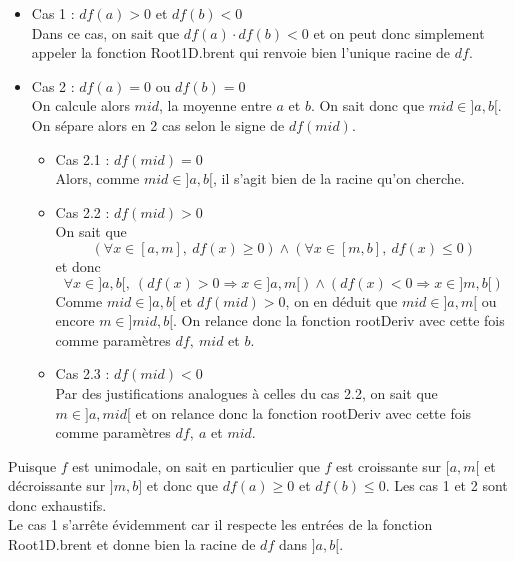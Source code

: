 \documentclass[a4paper, 12pt]{article}
\begin{document}
\begin{itemize}

    \item Cas 1 : \( df(a) > 0 \) et \( df(b) < 0 \) \\
Dans ce cas, on sait que \( df(a) \cdot df(b) < 0 \) et on peut donc simplement appeler la fonction Root1D.brent qui renvoie bien l'unique racine de \( df \).

    \item Cas 2 : \( df(a) = 0 \) ou \( df(b) = 0 \) \\
On calcule alors \( mid \), la moyenne entre \( a \) et \( b \). On sait donc que \( mid \in ]a, b[ \). On sépare alors en 2 cas selon le signe de \( df(mid) \).
    \begin{itemize}

        \item Cas 2.1 : \( df(mid) = 0 \) \\
Alors, comme \( mid \in ]a, b[ \), il s'agit bien de la racine qu'on cherche.

        \item Cas 2.2 : \( df(mid) > 0 \) \\
On sait que
$$
(\forall x \in [a, m],~ df(x) \geq 0) \land (\forall x \in [m, b],~ df(x) \leq 0)
$$
et donc
$$
\forall x \in ]a, b[,~ (df(x) > 0 \Longrightarrow x \in ]a, m[) \land (df(x) < 0 \Longrightarrow x \in ]m, b[)
$$
Comme \( mid \in ]a, b[ \) et \( df(mid) > 0 \), on en déduit que \( mid \in ]a, m[ \) ou encore \( m \in ]mid, b[ \). On relance donc la fonction rootDeriv avec cette fois comme paramètres \( df,~ mid \) et \( b \).

    \item Cas 2.3 : \( df(mid) < 0 \) \\
Par des justifications analogues à celles du cas 2.2, on sait que \( m \in ]a, mid[ \) et on relance donc la fonction rootDeriv avec cette fois comme paramètres \( df,~ a \) et \( mid \).

    \end{itemize}

\end{itemize}
Puisque \( f \) est unimodale, on sait en particulier que \( f \) est croissante sur \( [a, m[ \) et décroissante sur \( ]m, b] \) et donc que \( df(a) \geq 0 \) et \( df(b) \leq 0 \). Les cas 1 et 2 sont donc exhaustifs. \\
Le cas 1 s'arrête évidemment car il respecte les entrées de la fonction Root1D.brent et donne bien la racine de \( df \) dans \( ]a, b[ \).
\end{document}

